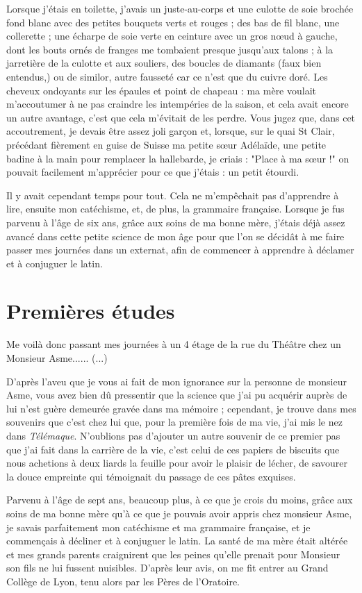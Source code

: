 \documentclass[11pt,a4paper]{report}
\begin{document}
Lorsque j'étais en toilette, j'avais un juste-au-corps et une culotte de soie brochée fond blanc avec des petites bouquets verts et rouges ; des bas de fil blanc, une collerette ; une écharpe de soie verte en ceinture avec un gros nœud à gauche, dont les bouts ornés de franges me tombaient presque jusqu'aux talons ; à la jarretière de la culotte et aux souliers, des boucles de diamants (faux bien entendus,) ou de similor, autre fausseté car ce n'est que du cuivre doré. Les cheveux ondoyants sur les épaules et point de chapeau : ma mère voulait m'accoutumer à ne pas craindre les intempéries de la saison, et cela avait encore un autre avantage, c'est que cela m'évitait de les perdre. Vous jugez que, dans cet accoutrement, je devais être assez joli garçon et, lorsque, sur le quai St Clair, précédant fièrement en guise de Suisse ma petite sœur Adélaïde, une petite badine à la main pour remplacer la hallebarde, je criais : "Place à ma sœur !" on pouvait facilement m'apprécier pour ce que j'étais : un petit étourdi.

Il y avait cependant temps pour tout. Cela ne m'empêchait pas d'apprendre à lire, ensuite mon catéchisme, et, de plus, la grammaire française. Lorsque je fus parvenu à l'âge de six ans, grâce aux soins de ma bonne mère, j'étais déjà assez avancé dans cette petite science de mon âge pour que l'on se décidât à me faire passer mes journées dans un externat, afin de commencer à apprendre à déclamer et à conjuguer le latin.

\section*{Premières études}

Me voilà donc passant mes journées à un 4 étage de la rue du Théâtre chez un Monsieur Asme...... (...)

D'après l'aveu que je vous ai fait de mon ignorance sur la personne de monsieur Asme, vous avez bien dû pressentir que la science que j'ai pu acquérir auprès de lui n'est guère demeurée gravée dans ma mémoire ; cependant, je trouve dans mes souvenirs que c'est chez lui que, pour la première fois de ma vie, j'ai mis le nez dans \textit{Télémaque}. N'oublions pas d'ajouter un autre souvenir de ce premier pas que j'ai fait dans la carrière de la vie, c'est celui de ces papiers de biscuits que nous achetions à deux liards la feuille pour avoir le plaisir de lécher, de savourer la douce empreinte qui témoignait du passage de ces pâtes exquises.

Parvenu à l'âge de sept ans, beaucoup plus, à ce que je crois du moins, grâce aux soins de ma bonne mère qu'à ce que je pouvais avoir appris chez monsieur Asme, je savais parfaitement mon catéchisme et ma grammaire française, et je commençais à décliner et à conjuguer le latin. La santé de ma mère était altérée et mes grands parents craignirent que les peines qu'elle prenait pour Monsieur son fils ne lui fussent nuisibles. D'après leur avis, on me fit entrer au Grand Collège de Lyon, tenu alors par les Pères de l'Oratoire.
\end{document}
